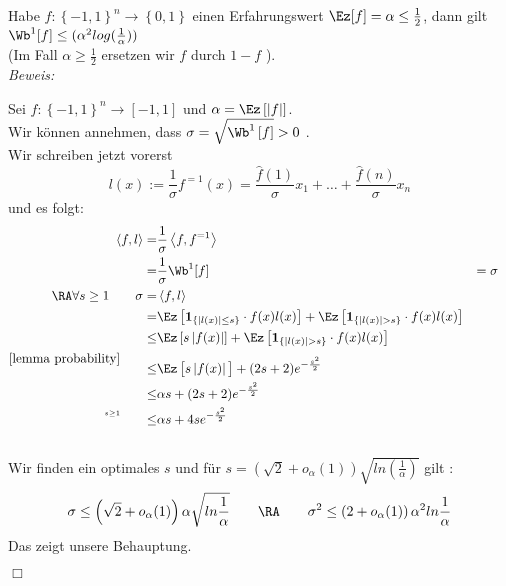 \documentclass{article}
\renewcommand{\ez}{\mathbf{1}}
\newenvironment{proof}{
	\textit{Beweis: \\}
}{
	\begin{flushright}
		$\Box$ 
	\end{flushright}
}
\begin{document}
	 \begin{satz}    $\qquad$ \vphantom{jasjjdasjdasjdsaj} \\
	 		 Habe $f:\left\lbrace -1,1 \right\rbrace^n \to \left\lbrace 0,1 \right\rbrace $ einen {Erfahrungswert} $ \Ez[f]= \alpha \leq \frac{1}{2} $, dann gilt 
	 		 $ \Wb^1[f] \leq (\alpha^2 log( \frac{1}{\alpha})) $\\
	 		 (Im Fall $ \alpha \geq\frac{1}{2}$ ersetzen wir $f $ durch $1-f$ ).\\
	 	 \begin{proof}
	 	 	Sei $f: \left\lbrace -1,1 \right\rbrace^n \to \left[ -1,1 \right] $ und $ \alpha = \Ez \left[ \left| f \right|\right] $.  \\
	 	 	Wir k\"onnen annehmen, dass $\sigma = \sqrt{\Wb^1\left[ f \right]} > 0 $ . \\
	 	 		 		 Wir schreiben jetzt vorerst \[ l(x) := \frac{1}{\sigma} f^{=1}(x) = \frac{\widehat{f}(1)}{\sigma}x_1 + \dots +   \frac{\widehat{f}(n)}{\sigma}x_n \] und es folgt:
	 	 	\begin{eqnarray*} 
	 		 	 \left\langle f,l \right\rangle =&  \frac{1}{\sigma} \left\langle f, f^{=1} \right\rangle \\
	 		 	 =& \frac{1}{\sigma} \Wb^1[f] & = \sigma \quad 		 \\
	 			\RA  \forall s \ge 1 \qquad \sigma = & \left\langle f,l \right\rangle & \\
	 			=& \Ez \left[ \ez_{\left\lbrace |l(x)| \le s \right\rbrace } \cdot f(x)l(x) \right] + \Ez \left[ \ez_{\left\lbrace |l(x)| > s \right\rbrace } \cdot f(x)l(x) \right]  &\\
	 			\le & \Ez \left[s \left| f(x) \right| \right] +  \Ez \left[ \ez_{\left\lbrace |l(x)| > s \right\rbrace } \cdot f(x)l(x) \right]  &\\
	 			^{\overset{\ref{lemma probability}}{}} \qquad {\le} &\Ez \left[s \left| f(x) \right| \vphantom{\big|} \right] + (2s+2) e^{-\frac{s^2}{2}}  &\\
	 			\le & \alpha s  + (2s+2) e^{-\frac{s^2}{2}} & \\
	 			^{\overset{s\ge 1}{} }\qquad {\le} & \alpha s  + 4s e^{-\frac{s^2}{2}} 
	 		\end{eqnarray*} \\
	 		Wir finden ein optimales $s$ und f\"ur  $s=\left(\sqrt{2} + o_{\alpha } (1) \right)  \sqrt{ln( \frac{1}{\alpha })} $ gilt :
	 		\[
	 			\sigma \le \left(\sqrt{2}+o_{\alpha}(1)\right) \alpha \sqrt{ln \frac{1}{\alpha}} \qquad \RA \qquad \sigma^2 \\
	 			\le \left(2 + o_{\alpha } (1) \right) \alpha^2 ln \frac{1}{\alpha}
	 		\]
	 		Das zeigt unsere Behauptung.
	 	 \end{proof}
	 \end{satz}
\end{document}
